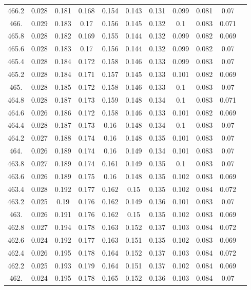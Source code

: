 \documentclass[12pt]{ctexart}
\numberwithin{equation}{section}
\begin{document}
\begin{longtable}{ccccccccccc}
466.2	&	0.028	&	0.181	&	0.168	&	0.154	&	0.143	&	0.131	&	0.099	&	0.081	&	0.07	\\
466.	&	0.029	&	0.183	&	0.17	&	0.156	&	0.145	&	0.132	&	0.1	&	0.083	&	0.071	\\
465.8	&	0.028	&	0.182	&	0.169	&	0.155	&	0.144	&	0.132	&	0.099	&	0.082	&	0.069	\\
465.6	&	0.028	&	0.183	&	0.17	&	0.156	&	0.144	&	0.132	&	0.099	&	0.082	&	0.07	\\
465.4	&	0.028	&	0.184	&	0.172	&	0.158	&	0.146	&	0.133	&	0.099	&	0.083	&	0.07	\\
465.2	&	0.028	&	0.184	&	0.171	&	0.157	&	0.145	&	0.133	&	0.101	&	0.082	&	0.069	\\
465.	&	0.028	&	0.185	&	0.172	&	0.158	&	0.146	&	0.133	&	0.1	&	0.083	&	0.07	\\
464.8	&	0.028	&	0.187	&	0.173	&	0.159	&	0.148	&	0.134	&	0.1	&	0.083	&	0.071	\\
464.6	&	0.026	&	0.186	&	0.172	&	0.158	&	0.146	&	0.133	&	0.101	&	0.082	&	0.069	\\
464.4	&	0.028	&	0.187	&	0.173	&	0.16	&	0.148	&	0.134	&	0.1	&	0.083	&	0.07	\\
464.2	&	0.027	&	0.188	&	0.174	&	0.16	&	0.148	&	0.135	&	0.101	&	0.083	&	0.07	\\
464.	&	0.026	&	0.189	&	0.174	&	0.16	&	0.149	&	0.134	&	0.101	&	0.083	&	0.07	\\
463.8	&	0.027	&	0.189	&	0.174	&	0.161	&	0.149	&	0.135	&	0.1	&	0.083	&	0.07	\\
463.6	&	0.026	&	0.189	&	0.175	&	0.16	&	0.148	&	0.135	&	0.102	&	0.083	&	0.069	\\
463.4	&	0.028	&	0.192	&	0.177	&	0.162	&	0.15	&	0.135	&	0.102	&	0.084	&	0.072	\\
463.2	&	0.025	&	0.19	&	0.176	&	0.162	&	0.149	&	0.136	&	0.101	&	0.083	&	0.07	\\
463.	&	0.026	&	0.191	&	0.176	&	0.162	&	0.15	&	0.135	&	0.102	&	0.083	&	0.069	\\
462.8	&	0.027	&	0.194	&	0.178	&	0.163	&	0.152	&	0.137	&	0.103	&	0.084	&	0.072	\\
462.6	&	0.024	&	0.192	&	0.177	&	0.163	&	0.151	&	0.135	&	0.102	&	0.083	&	0.069	\\
462.4	&	0.026	&	0.195	&	0.178	&	0.164	&	0.152	&	0.137	&	0.103	&	0.084	&	0.072	\\
462.2	&	0.025	&	0.193	&	0.179	&	0.164	&	0.151	&	0.137	&	0.102	&	0.084	&	0.069	\\
462.	&	0.024	&	0.195	&	0.178	&	0.165	&	0.152	&	0.136	&	0.103	&	0.084	&	0.07	\\

\end{longtable}
\end{document}
